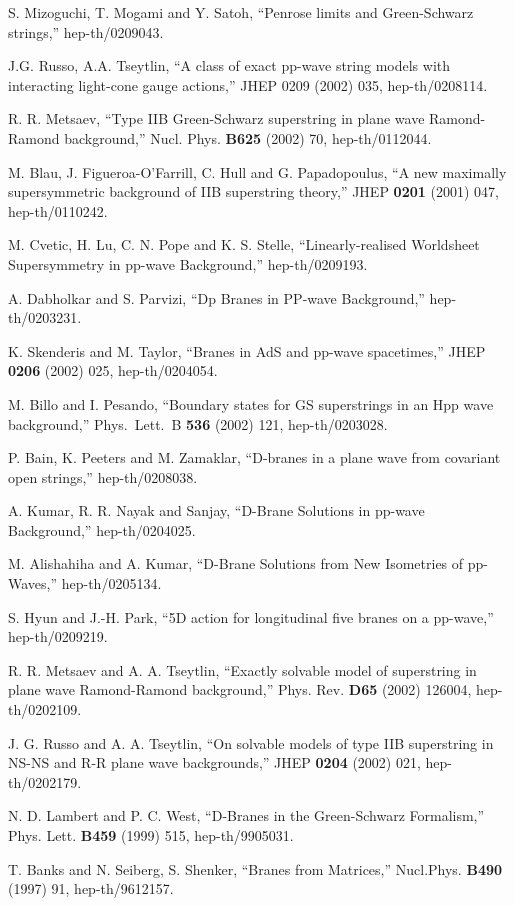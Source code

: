 \documentclass[a4paper,12pt]{article}
\begin{document}
\begin{thebibliography}{99}
 S. Mizoguchi, T. Mogami and Y. Satoh, ``Penrose
  limits and Green-Schwarz strings,'' hep-th/0209043.

 J.G. Russo, A.A. Tseytlin, ``A class of exact pp-wave 
string models with interacting light-cone gauge actions,''
JHEP 0209 (2002) 035, hep-th/0208114.

 R. R. Metsaev, ``Type IIB Green-Schwarz superstring
  in plane wave Ramond-Ramond background,'' Nucl. Phys.  {\bf B625}
  (2002) 70, hep-th/0112044.
 
 M. Blau, J. Figueroa-O'Farrill, C. Hull and G.
  Papadopoulus, ``A new maximally supersymmetric background of IIB
  superstring theory,'' JHEP {\bf 0201} (2001) 047, hep-th/0110242.
   
 M. Cvetic, H. Lu, C. N. Pope and K. S. Stelle,
  ``Linearly-realised Worldsheet Supersymmetry in pp-wave
  Background,'' hep-th/0209193.

 A. Dabholkar and S. Parvizi, ``Dp Branes in PP-wave
  Background,'' hep-th/0203231.
  
 K. Skenderis and M. Taylor, ``Branes in AdS and
  pp-wave spacetimes,'' JHEP {\bf 0206} (2002) 025, hep-th/0204054.

 M. Billo and I. Pesando, ``Boundary states for GS
superstrings in an Hpp wave background,'' Phys.\ Lett.\ B {\bf 536}
(2002) 121, hep-th/0203028.

 P. Bain, K. Peeters and M. Zamaklar, ``D-branes in a
plane wave from covariant open strings,'' hep-th/0208038.

 A. Kumar, R. R. Nayak and Sanjay, ``D-Brane Solutions
  in pp-wave Background,'' hep-th/0204025.
  
 M. Alishahiha and A. Kumar, ``D-Brane Solutions from
  New Isometries of pp-Waves,'' hep-th/0205134.

 S. Hyun and J.-H. Park, ``5D action for longitudinal
five branes on a pp-wave,'' hep-th/0209219.

 R. R. Metsaev and A. A. Tseytlin,
  ``Exactly solvable model of superstring in plane wave Ramond-Ramond
  background,'' Phys.  Rev. {\bf D65} (2002) 126004, hep-th/0202109.

 J. G. Russo and A. A. Tseytlin, ``On solvable models
  of type IIB superstring in NS-NS and R-R plane wave backgrounds,''
  JHEP {\bf 0204} (2002) 021, hep-th/0202179.

 N. D. Lambert and P. C. West, ``D-Branes in the
  Green-Schwarz Formalism,'' Phys. Lett. {\bf B459} (1999) 515,
  hep-th/9905031.
 
 T. Banks and N. Seiberg, S. Shenker, ``Branes from
Matrices,'' Nucl.Phys. {\bf B490} (1997) 91, hep-th/9612157.
 
\end{thebibliography}
\end{document}
